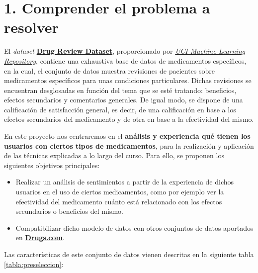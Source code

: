\documentclass[spanish,]{article}
\begin{document}
\newpage

\section{1. Comprender el problema a
resolver}\label{comprender-el-problema-a-resolver}

El \emph{dataset}
\href{https://archive.ics.uci.edu/ml/datasets/Drug+Review+Dataset+\%28Druglib.com\%29}{\textbf{Drug
Review Dataset}}, proporcionado por
\href{https://archive.ics.uci.edu/ml/index.php}{\emph{UCI Machine
Learning Repository}}, contiene una exhaustiva base de datos de
medicamentos específicos, en la cual, el conjunto de datos muestra
revisiones de pacientes sobre medicamentos específicos para unas
condiciones particulares. Dichas revisiones se encuentran desglosadas en
función del tema que se esté tratando: beneficios, efectos secundarios y
comentarios generales. De igual modo, se dispone de una calificación de
satisfacción general, es decir, de una calificación en base a los
efectos secundarios del medicamento y de otra en base a la efectividad
del mismo.

En este proyecto nos centraremos en el \textbf{análisis y experiencia
qué tienen los usuarios con ciertos tipos de medicamentos}, para la
realización y aplicación de las técnicas explicadas a lo largo del
curso. Para ello, se proponen los siguientes objetivos principales:

\begin{itemize}
\item
  Realizar un análisis de sentimientos a partir de la experiencia de
  dichos usuarios en el uso de ciertos medicamentos, como por ejemplo
  ver la efectividad del medicamento cuánto está relacionado con los
  efectos secundarios o beneficios del mismo.
\item
  Compatibilizar dicho modelo de datos con otros conjuntos de datos
  aportados en \href{https://www.drugs.com/}{\textbf{Drugs.com}}.
\end{itemize}

Las características de este conjunto de datos vienen descritas en la
siguiente tabla \ref{tabla:preseleccion}:
\end{document}
